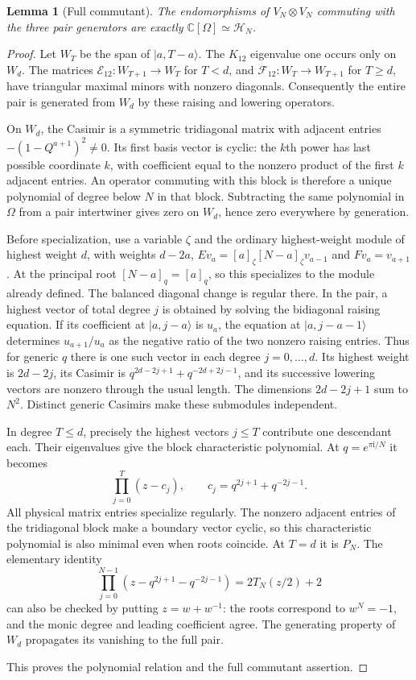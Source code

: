 \documentclass[11pt]{article}
\numberwithin{equation}{section}
\newtheorem{lemma}[theorem]{Lemma}
\theoremstyle{definition}\newtheorem{definition}[theorem]{Definition}
\theoremstyle{remark}\newtheorem{remark}[theorem]{Remark}
\newcommand{\ii}{\mathrm i}\newcommand{\dd}{\mathrm d}
\newcommand{\CC}{\mathbb C}\newcommand{\RR}{\mathbb R}\newcommand{\ZZ}{\mathbb Z}
\newcommand{\cH}{\mathcal H}\newcommand{\Bhat}{\widehat B}
\begin{document}
\begin{lemma}[Full commutant]\label{lem:commutant}
The endomorphisms of $V_N\otimes V_N$ commuting with the three pair generators are exactly $\CC[\Omega]\simeq\cH_N$.
\end{lemma}
\begin{proof}
Let $W_T$ be the span of $|a,T-a\rangle$. The $K_{12}$ eigenvalue one occurs only on $W_d$. The matrices $\mathcal E_{12}:W_{T+1}\to W_T$ for $T<d$, and $\mathcal F_{12}:W_T\to W_{T+1}$ for $T\ge d$, have triangular maximal minors with nonzero diagonals. Consequently the entire pair is generated from $W_d$ by these raising and lowering operators.

On $W_d$, the Casimir is a symmetric tridiagonal matrix with adjacent entries $-(1-Q^{a+1})^2\ne0$. Its first basis vector is cyclic: the $k$th power has last possible coordinate $k$, with coefficient equal to the nonzero product of the first $k$ adjacent entries. An operator commuting with this block is therefore a unique polynomial of degree below $N$ in that block. Subtracting the same polynomial in $\Omega$ from a pair intertwiner gives zero on $W_d$, hence zero everywhere by generation.

Before specialization, use a variable $\zeta$ and the ordinary
highest-weight module of highest weight $d$, with weights $d-2a$,
$E v_a=[a]_\zeta[N-a]_\zeta v_{a-1}$ and $Fv_a=v_{a+1}$.
At the principal root $[N-a]_q=[a]_q$, so this specializes to the
module already defined. The balanced diagonal change is regular there. In the pair, a highest vector of total degree $j$ is obtained by solving the bidiagonal raising equation. If its coefficient at $|a,j-a\rangle$ is $u_a$, the equation at $|a,j-a-1\rangle$ determines $u_{a+1}/u_a$ as the negative ratio of the two nonzero raising entries. Thus for generic $q$ there is one such vector in each degree $j=0,\ldots,d$. Its highest weight is $2d-2j$, its Casimir is $q^{2d-2j+1}+q^{-2d+2j-1}$, and its successive lowering vectors are nonzero through the usual length. The dimensions $2d-2j+1$ sum to $N^2$. Distinct generic Casimirs make these submodules independent.

In degree $T\le d$, precisely the highest vectors $j\le T$ contribute one descendant each. Their eigenvalues give the block characteristic polynomial. At $q=e^{\pi\ii/N}$ it becomes
\[
 \prod_{j=0}^{T}(z-c_j),\qquad c_j=q^{2j+1}+q^{-2j-1}.
\]
All physical matrix entries specialize regularly. The nonzero adjacent entries of the tridiagonal block make a boundary vector cyclic, so this characteristic polynomial is also minimal even when roots coincide. At $T=d$ it is $P_N$. The elementary identity
\[
 \prod_{j=0}^{N-1}(z-q^{2j+1}-q^{-2j-1})=2T_N(z/2)+2
\]
can also be checked by putting $z=w+w^{-1}$: the roots correspond to $w^N=-1$, and the monic degree and leading coefficient agree. The generating property of $W_d$ propagates its vanishing to the full pair.


This proves the polynomial relation and the full commutant assertion.

\end{proof}
\end{document}
